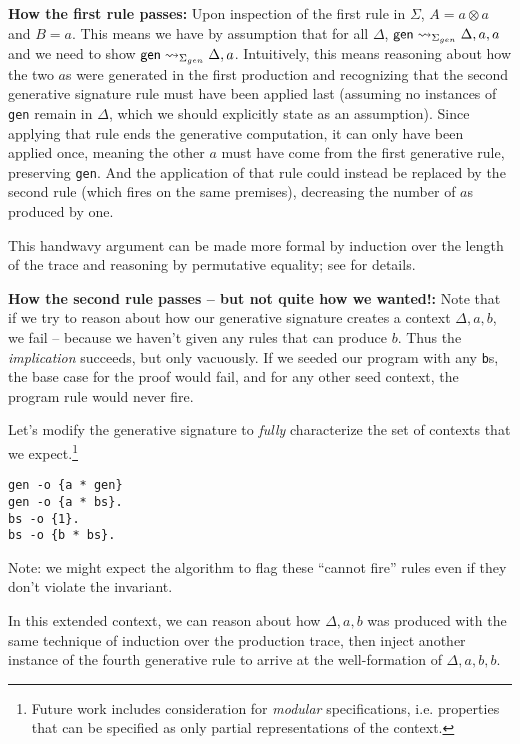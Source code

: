 \documentclass[fullpage, 11pt]{article}
\newcommand{\tensor}{\otimes}
\newcommand{\stepsto}{\rightsquigarrow}
\begin{document}
{\bf How the first rule passes:} Upon inspection of the first rule in
$\Sigma$, $A = a \tensor a$ and $B = a$. This means we have by assumption
that for all $\Delta$, ${\sf gen}\stepsto_{\Sigma_{gen}} \Delta, a, a$ and
we need to show ${\sf gen} \stepsto_{\Sigma_{gen}} \Delta, a$. Intuitively,
this means reasoning about how the two $a$s were generated in the first
production and recognizing that the second generative signature rule must
have been applied last (assuming no instances of \verb|gen| remain in
$\Delta$, which we should explicitly state as an assumption). Since
applying that rule ends the generative computation, it can only have been
applied once, meaning the other $a$ must have come from the first
generative rule, preserving \verb|gen|. And the application of that rule
could instead be replaced by the second rule (which fires on the same
premises), decreasing the number of $a$s produced by one.

This handwavy argument can be made more formal by induction over the length
of the trace and reasoning by permutative equality; see
\cite{simmons12thesis} for details.

{\bf How the second rule passes -- but not quite how we wanted!:} Note that
if we try to reason about how our generative signature creates a context
$\Delta, a, b$, we fail -- because we haven't given any rules that can
produce $b$. Thus the {\em implication} succeeds, but only vacuously. If we
seeded our program with any \verb|b|s, the base case for the proof would
fail, and for any other seed context, the program rule would never fire.

Let's modify the generative signature to {\em fully} characterize the set
of contexts that we expect.\footnote{Future work includes consideration for
{\em modular} specifications, i.e. properties that can be specified as only
partial representations of the context.}

\begin{verbatim}
gen -o {a * gen}
gen -o {a * bs}.
bs -o {1}.
bs -o {b * bs}.
\end{verbatim}

Note: we might expect the algorithm to flag these ``cannot fire'' rules
even if they don't violate the invariant.

In this extended context, we can reason about how $\Delta, a, b$ was
produced with the same technique of induction over the production trace,
then inject another instance of the fourth generative rule to arrive at the
well-formation of $\Delta, a, b, b$.
\end{document}
